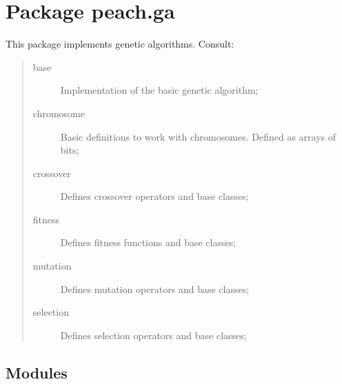 %
%
%


\section{Package peach.ga}

    \label{peach:ga}

This package implements genetic algorithms. Consult:
%
\begin{quote}
%
\begin{description}
\item[{base}] \leavevmode 
Implementation of the basic genetic algorithm;

\item[{chromosome}] \leavevmode 
Basic definitions to work with chromosomes. Defined as arrays of bits;

\item[{crossover}] \leavevmode 
Defines crossover operators and base classes;

\item[{fitness}] \leavevmode 
Defines fitness functions and base classes;

\item[{mutation}] \leavevmode 
Defines mutation operators and base classes;

\item[{selection}] \leavevmode 
Defines selection operators and base classes;

\end{description}

\end{quote}


\subsection{Modules}

